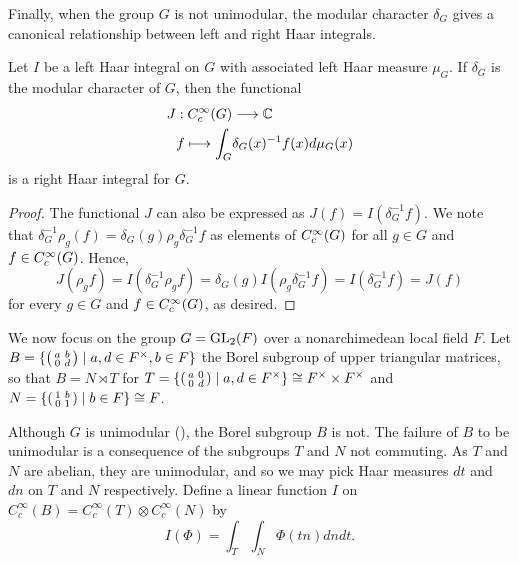 Finally, when the group $G$ is not unimodular, the modular character $\delta_G$ gives a canonical relationship between left and right Haar integrals.

\begin{lemma}
    Let $I$ be a left Haar integral on $G$ with associated left Haar measure $\mu_G$. If $\delta_G$ is the modular character of $G$, then the functional
    \begin{align*}
        J:C_c^{\infty}(G)&\longrightarrow\mathbb{C}\\
        f\longmapsto\int_G& \delta_G(x)^{-1}f(x)d\mu_G(x)
    \end{align*}
    is a right Haar integral for $G$.
\end{lemma}
\begin{proof}
    The functional $J$ can also be expressed as $J(f)=I(\delta_G^{-1}f)$. We note that $\delta_G^{-1}\rho_g(f)=\delta_G(g)\rho_g\delta_G^{-1}f$ as elements of $C_c^{\infty}(G)$ for all $g\in G$ and $f\in C_c^{\infty}(G)$.  Hence, 
    $$J(\rho_g f)=I(\delta_G^{-1}\rho_g f)=\delta_G(g)I(\rho_g\delta_G^{-1}f)=I(\delta^{-1}_G f)=J(f)$$
    for every $g\in G$ and $f\in C_c^{\infty}(G)$, as desired.
\end{proof}



We now focus on the group $G=\mathrm{GL}_2(F)$ over a nonarchimedean local field $F$. Let $B=\{\begin{psmallmatrix} a&b\\0&d\end{psmallmatrix} \mid a,d \in F^\times, b \in F\}$ the Borel subgroup of upper triangular matrices, so that $B=N \rtimes T$ for $T=\{\begin{psmallmatrix}
    a&0\\0&d
\end{psmallmatrix}\mid a,d \in F^\times\} \cong F^\times \times F^\times$ and $N=\{\begin{psmallmatrix}
    1&b\\0&1
\end{psmallmatrix}\mid b \in F\}\cong F$.

Although $G$ is unimodular (\cite[Proposition 7.5]{BH1}), the Borel subgroup $B$ is not. The failure of $B$ to be unimodular is a consequence of the subgroups $T$ and $N$ not commuting. As $T$ and $N$ are abelian, they are unimodular, and so we may pick Haar measures $dt$ and $dn$ on $T$ and $N$ respectively. Define a linear function $I$ on $C_c^\infty(B) = C_c^\infty(T) \otimes C_c^\infty(N)$ by
$$I(\Phi) = \int_T\int_N \Phi(tn) dn dt.$$

